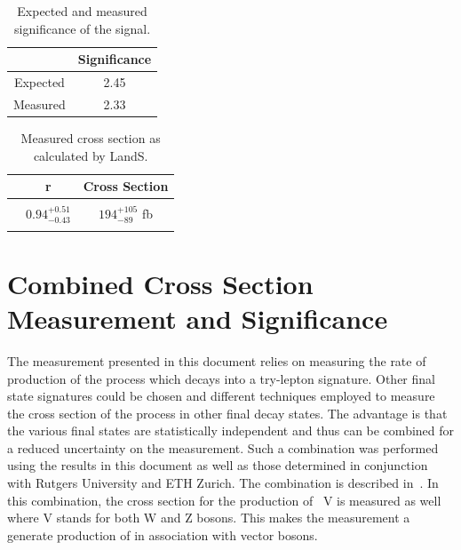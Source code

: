  
 
\begin{table}[ht!]
\begin{center}
\caption{\small \label{tab:significance} Expected and measured significance of the signal.}
\begin{tabular}{c|c}\hline
	& Significance	 \\ \hline
Expected	& 2.45	 \\
Measured	& 2.33	 \\
\hline
\end{tabular}
\end{center}
\end{table}
 
\begin{table}[ht!]
\begin{center}
\caption{\small \label{tab:landsout} Measured cross section as calculated by LandS.}
\begin{tabular}{c|cc}\hline
	& r        & Cross Section	 \\ \hline
	&  & \\
\ttZ	& $0.94 _{-0.43} ^{+0.51}$ & 	$194 _{-89} ^{+105}$ fb\\
& & \\
\hline
\end{tabular}
\end{center}
\end{table}
 
 
 
 
 
 
 
 \clearpage
 
 
 \section{Combined Cross Section Measurement and Significance}
 The measurement presented in this document relies on measuring the rate of production of the \ttZ process which decays into a try-lepton signature. Other final state signatures could be chosen and different techniques employed to measure the cross section of the \ttZ process in other final decay states. The advantage is that the various final states are statistically independent and thus can be combined for a reduced uncertainty on the measurement. Such a combination was performed using the results in this document as well as those determined in conjunction with Rutgers University and ETH Zurich. The combination is described in~\cite{ttV_combination}. In this combination, the cross section for the production of \ttbar~V is measured as well where V stands for both W and Z bosons. This makes the measurement a generate production of \ttbar in association with vector bosons.\\
 
